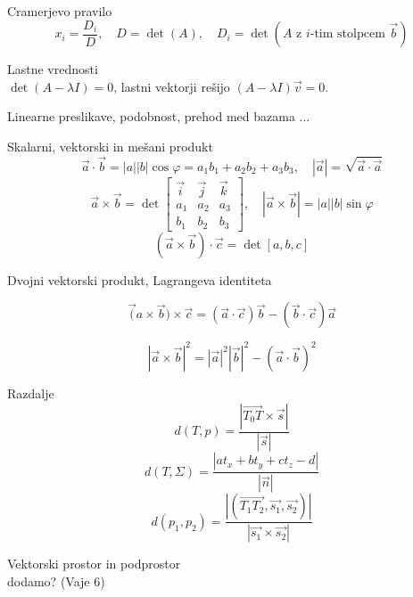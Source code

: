 \documentclass[a4paper,10pt]{article}
\begin{document}
\begin{multicols}{2}
\begin{formulaBox}{Cramerjevo pravilo}
\[
x_i = \frac{D_i}{D},\quad D=\det(A),\quad D_i=\det(A \text{ z $i$-tim stolpcem $\vec b$})
\]
\end{formulaBox}

\begin{formulaBox}{Lastne vrednosti}
	\\
$\det(A-\lambda I)=0$, lastni vektorji rešijo $(A-\lambda I)\vec v=0$.
\end{formulaBox}

\begin{formulaBox}{Linearne preslikave, podobnost, prehod med bazama}
	...
\end{formulaBox}

\begin{formulaBox}{Skalarni, vektorski in mešani produkt}
\[
\vec a\cdot \vec b = |a||b|\cos\varphi =a_1b_1+a_2b_2+a_3b_3,\quad |\vec a|=\sqrt{\vec a\cdot \vec a}
\]
\[
\vec a\times \vec b = 
\det\begin{bmatrix}
\vec i & \vec j & \vec k\\
a_1 & a_2 & a_3\\
b_1 & b_2 & b_3
\end{bmatrix},\quad
|\vec a\times \vec b|=|a||b|\sin\varphi
\]
\[
(\vec a\times \vec b)\cdot \vec c = \det[a,b,c]
\]
\end{formulaBox}

\begin{formulaBox}{Dvojni vektorski produkt, Lagrangeva identiteta}

\[
\vec (a\times\vec b)\times \vec c= (\vec a\cdot \vec c)\vec b-(\vec b\cdot \vec c)\vec a
\]

\[
|\vec a\times \vec b|^2=|\vec a|^2|\vec b|^2-(\vec a\cdot \vec b)^2
\]
\end{formulaBox}

\begin{formulaBox}{Razdalje}
    \[d(T, p) = \frac{|\overrightarrow{T_0T} \times \vec{s}|}{|\vec{s}|}\]
    \[d(T, \Sigma) = \frac{|at_x + bt_y + ct_z - d|}{|\vec{n}|}\]
    \[d(p_1, p_2) = \frac{|(\overrightarrow{T_1T_2}, \vec{s_1}, \vec{s_2})|}{|\vec{s_1} \times \vec{s_2}|}\]
\end{formulaBox}

\begin{formulaBox}{Vektorski prostor in podprostor}
	\\
	dodamo? (Vaje 6)
\end{formulaBox}


\end{multicols}
\end{document}
